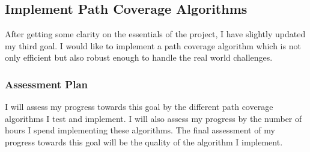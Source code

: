\documentclass[12pt]{article}
\begin{document}
\subsection*{Implement Path Coverage Algorithms}
After getting some clarity on the essentials of the project, I have slightly
updated my third goal. I would like to implement a path coverage algorithm
which is not only efficient but also robust enough to handle the real world
challenges.

\subsubsection*{Assessment Plan}
I will assess my progress towards this goal by the different path coverage
algorithms I test and implement. I will also assess my progress by the number
of hours I spend implementing these algorithms. The final assessment of my
progress towards this goal will be the quality of the algorithm I implement.
\end{document}
